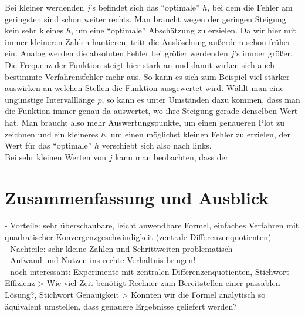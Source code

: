 \documentclass{scrartcl}
\begin{document}
Bei kleiner werdenden $j$'s befindet sich das "`optimale"' $h$, bei dem die Fehler am geringsten sind schon weiter rechts. Man braucht wegen der geringen Steigung kein sehr kleines $h$, um eine "`optimale"' Abschätzung zu erzielen. Da wir hier mit immer kleineren Zahlen hantieren, tritt die Auslöschung außerdem schon früher ein.
Analog werden die absoluten Fehler bei größer werdenden $j$'s immer größer.
Die Frequenz der Funktion steigt hier stark an und damit wirken sich auch bestimmte Verfahrensfehler mehr aus. So kann es sich zum Beispiel viel stärker auswirken an welchen Stellen die Funktion ausgewertet wird. Wählt man eine ungünstige Intervalllänge $p$, so kann es unter Umständen dazu kommen, dass man die Funktion immer genau da auswertet, wo ihre Steigung gerade denselben Wert hat.
Man braucht also mehr Auswertungspunkte, um einen genaueren Plot zu zeichnen und ein kleineres $h$, um einen möglichst kleinen Fehler zu erzielen, der Wert für das "`optimale"' $h$ verschiebt sich also nach links.\\
Bei sehr kleinen Werten von $j$ kann man beobachten, dass der

\pagebreak \section{Zusammenfassung und Ausblick}
\label{sec:zusammenfassung}
- Vorteile: sehr überschaubare, leicht anwendbare Formel, einfaches Verfahren mit
quadratischer Konvergenzgeschwindigkeit (zentrale Differenzenquotienten) \\
- Nachteile: sehr kleine Zahlen und Schrittweiten problematisch \\
- Aufwand und Nutzen ins rechte Verhältnis bringen! \\
- noch interessant: Experimente mit zentralen Differenzenquotienten, Stichwort
Effizienz > Wie viel Zeit benötigt Rechner zum Bereitstellen einer passablen Lösung?,
Stichwort Genauigkeit > Könnten wir die Formel analytisch so äquivalent umstellen,
dass genauere Ergebnisse geliefert werden? \\



\end{document}
